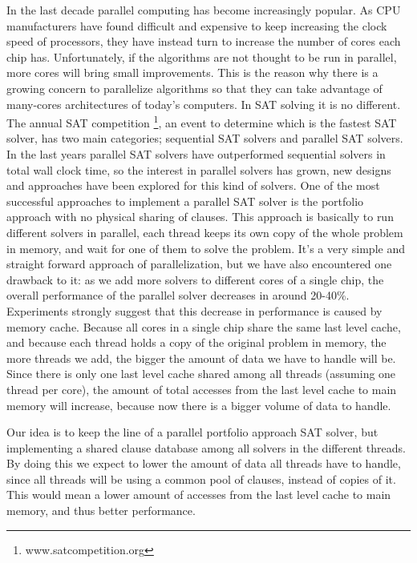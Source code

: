 \documentclass[12pt]{diicc}
\begin{document}
In the last decade parallel computing has become increasingly popular. As CPU manufacturers have found difficult and expensive to keep increasing the clock speed of processors, they have instead turn to increase the number of cores each chip has. Unfortunately, if the algorithms are not thought to be run in parallel, more cores will bring small improvements. This is the reason why there is a growing concern to parallelize algorithms so that they can take advantage of many-cores architectures of today's computers. In SAT solving it is no different. The annual SAT competition \footnote[1]{www.satcompetition.org}, an event to determine which is the fastest SAT solver, has two main categories; sequential SAT solvers and parallel SAT solvers. In the last years parallel SAT solvers have outperformed sequential solvers in total wall clock time, so the interest in parallel solvers has grown, new designs and approaches have been explored for this kind of solvers. One of the most successful approaches to implement a parallel SAT solver is the portfolio approach with no physical sharing of clauses. This approach is basically to run different solvers in parallel, each thread keeps its own copy of the whole problem in memory, and wait for one of them to solve the problem. It's a very simple and straight forward approach of parallelization, but we have also encountered one drawback to it: as we add more solvers to different cores of a single chip, the overall performance of the parallel solver decreases in around 20-40\%. Experiments strongly suggest that this decrease in performance is caused by memory cache. Because all cores in a single chip share the same last level cache, and because each thread holds a copy of the original problem in memory, the more threads we add, the bigger the amount of data we have to handle will be. Since there is only one last level cache shared among all threads (assuming one thread per core), the amount of total accesses from the last level cache to main memory will increase, because now there is a bigger volume of data to handle. 

Our idea is to keep the line of a parallel portfolio approach SAT solver, but implementing a shared clause database among all solvers in the different threads. By doing this we expect to lower the amount of data all threads have to handle, since all threads will be using a common pool of clauses, instead of copies of it. This would mean a lower amount of accesses from the last level cache to main memory, and thus better performance.
\end{document}
